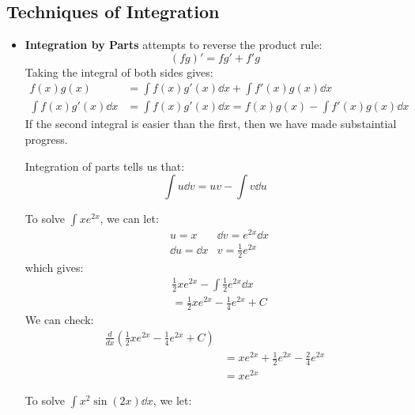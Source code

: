\subsection{Techniques of Integration}
\begin{itemize}
    \item \textbf{Integration by Parts} attempts to reverse the product rule:
    \begin{equation}
        (fg)' = fg' + f'g
    \end{equation}
    Taking the integral of both sides gives:
    \begin{align}
        f(x)g(x) &= \int f(x)g'(x) \dd{x} + \int f'(x) g(x) \dd{x} \\ 
        \int f(x)g'(x) \dd{x} &= \int f(x) g'(x) \dd{x} = f(x)g(x) - \int f'(x)g(x) \dd{x}
    \end{align}
    If the second integral is easier than the first, then we have made substaintial progress.
    \begin{idea}
        Integration of parts tells us that:
        \begin{equation}
            \int u \dd{v} = uv - \int v \dd{u}
        \end{equation}
    \end{idea}
    \begin{example}
        To solve $\int xe^{2x}$, we can let:
        \begin{align}
            &u=x            &\dd{v} = e^{2x} \dd{x} \\ 
            &\dd{u}=\dd{x} &v=\frac{1}{2}e^{2x} 
        \end{align}
        which gives:
        \begin{align}
            & \frac{1}{2}xe^{2x} - \int \frac{1}{2}e^{2x} \dd{x} \\ 
            &= \frac{1}{2}xe^{2x} - \frac{1}{4}e^{2x} + C
        \end{align}
        We can check:
        \begin{align}
            \frac{d}{dx}\left(\frac{1}{2}xe^{2x}-\frac{1}{4}e^{2x}+C\right) \\ 
            &= xe^{2x} + \frac{1}{2}e^{2x}-\frac{2}{4}e^{2x} \\ 
            &= xe^{2x}
        \end{align}
    \end{example}
    \begin{example}
        To solve $\int x^2\sin(2x) \dd{x}$, we let:
        \begin{align}

\end{align}
\end{example}
\end{itemize}
